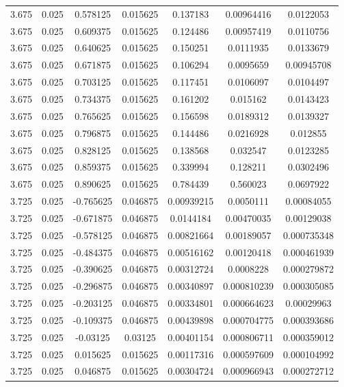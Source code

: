 \begin{table}[bh]
\begin{center}
{\begin{tabular}{ccccccc}
3.675	 & 0.025 & 	0.578125	 & 0.015625	 & 0.137183	 & 0.00964416	 & 0.0122053 \\ 
3.675	 & 0.025 & 	0.609375	 & 0.015625	 & 0.124486	 & 0.00957419	 & 0.0110756 \\ 
3.675	 & 0.025 & 	0.640625	 & 0.015625	 & 0.150251	 & 0.0111935	 & 0.0133679 \\ 
3.675	 & 0.025 & 	0.671875	 & 0.015625	 & 0.106294	 & 0.0095659	 & 0.00945708 \\ 
3.675	 & 0.025 & 	0.703125	 & 0.015625	 & 0.117451	 & 0.0106097	 & 0.0104497 \\ 
3.675	 & 0.025 & 	0.734375	 & 0.015625	 & 0.161202	 & 0.015162	 & 0.0143423 \\ 
3.675	 & 0.025 & 	0.765625	 & 0.015625	 & 0.156598	 & 0.0189312	 & 0.0139327 \\ 
3.675	 & 0.025 & 	0.796875	 & 0.015625	 & 0.144486	 & 0.0216928	 & 0.012855 \\ 
3.675	 & 0.025 & 	0.828125	 & 0.015625	 & 0.138568	 & 0.032547	 & 0.0123285 \\ 
3.675	 & 0.025 & 	0.859375	 & 0.015625	 & 0.339994	 & 0.128211	 & 0.0302496 \\ 
3.675	 & 0.025 & 	0.890625	 & 0.015625	 & 0.784439	 & 0.560023	 & 0.0697922 \\ 
3.725	 & 0.025 & 	-0.765625	 & 0.046875	 & 0.00939215	 & 0.0050111	 & 0.00084055 \\ 
3.725	 & 0.025 & 	-0.671875	 & 0.046875	 & 0.0144184	 & 0.00470035	 & 0.00129038 \\ 
3.725	 & 0.025 & 	-0.578125	 & 0.046875	 & 0.00821664	 & 0.00189057	 & 0.000735348 \\ 
3.725	 & 0.025 & 	-0.484375	 & 0.046875	 & 0.00516162	 & 0.00120418	 & 0.000461939 \\ 
3.725	 & 0.025 & 	-0.390625	 & 0.046875	 & 0.00312724	 & 0.0008228	 & 0.000279872 \\ 
3.725	 & 0.025 & 	-0.296875	 & 0.046875	 & 0.00340897	 & 0.000810239	 & 0.000305085 \\ 
3.725	 & 0.025 & 	-0.203125	 & 0.046875	 & 0.00334801	 & 0.000664623	 & 0.00029963 \\ 
3.725	 & 0.025 & 	-0.109375	 & 0.046875	 & 0.00439898	 & 0.000704775	 & 0.000393686 \\ 
3.725	 & 0.025 & 	-0.03125	 & 0.03125	 & 0.00401154	 & 0.000806711	 & 0.000359012 \\ 
3.725	 & 0.025 & 	0.015625	 & 0.015625	 & 0.00117316	 & 0.000597609	 & 0.000104992 \\ 
3.725	 & 0.025 & 	0.046875	 & 0.015625	 & 0.00304724	 & 0.000966943	 & 0.000272712 \\ 

\end{tabular}}
\end{center}
\end{table}
